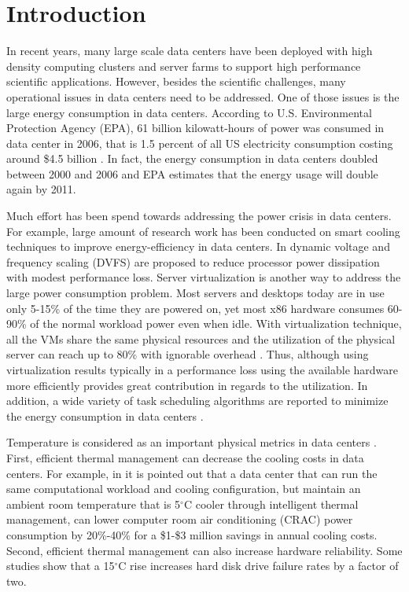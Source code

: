 \section{Introduction}

In recent years, many large scale data centers have been deployed with high density computing clusters and server farms to support high performance scientific applications. However, besides the scientific challenges, many operational issues in data centers need to be addressed. One of those issues is the large energy consumption in data centers. According to U.S. Environmental Protection Agency (EPA), 61 billion kilowatt-hours of power was consumed in data center in 2006, that is 1.5 percent of all US electricity consumption costing around \$4.5 billion \cite{www-epa}. In fact, the energy consumption in data centers doubled between 2000 and 2006 and EPA estimates that the energy usage will double again by 2011. 

Much effort has been spend towards addressing the power crisis in data centers. For example, large amount of research work has been conducted on smart cooling techniques \cite{patel2002tcc, beitelmal2007tfp, moore2005dcw, moore2006wao}  to improve energy-efficiency in data centers. In \cite{hsu2005fap,DBLP:conf/sc/HsuF05} dynamic voltage and frequency scaling (DVFS) are proposed to reduce processor power dissipation with modest performance loss. Server virtualization \cite{DBLP:conf/sosp/BarhamDFHHHN03} is another way to address the large power consumption problem. Most servers and desktops today are in use only 5-15\% of the time they are powered on, yet most x86 hardware consumes 60-90\% of the normal workload power even when idle. With virtualization technique, all the VMs share the same physical resources and the utilization of the physical server can reach up to 80\% with ignorable overhead \cite{DBLP:conf/nca/SilvaASTA07}. Thus, although using virtualization results typically in a performance loss using the available hardware more efficiently provides great contribution in regards to the utilization. In addition, a wide variety of task scheduling algorithms are reported to minimize the energy consumption in data centers \cite{DBLP:conf/ccgrid/KimBK07,DBLP:conf/sc/GeFC05,DBLP:conf/cluster/TangGV07,DBLP:conf/usenix/MooreCRS05,DBLP:conf/aPcsac/VandersterBD07}. 

Temperature is considered as an important physical metrics in data centers \cite{hamann2008mat}. First, efficient thermal management can decrease the cooling costs in data centers. For example, in \cite{DBLP:conf/usenix/MooreCRS05} it is pointed out that a data center that can run the same computational workload and cooling configuration, but maintain an ambient room temperature that is 5$^\circ$C cooler through intelligent thermal management, can lower computer room air conditioning (CRAC) power consumption by 20\%-40\% for a \$1-\$3 million savings in annual cooling costs. Second, efficient thermal management can also increase hardware reliability. Some studies \cite{DBLP:conf/fast/AndersonDR03, cole2000edr} show that a 15$^\circ$C rise increases hard disk drive failure rates by a factor of two. 

